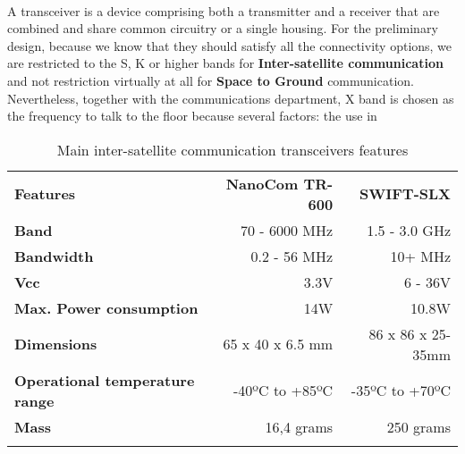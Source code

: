 \paragraph{} A transceiver is a device comprising both a transmitter and a receiver that are combined and share common circuitry or a single housing. For the preliminary design, because we know that they should satisfy all the connectivity options, we are restricted to the S, K or higher bands for \textbf{Inter-satellite communication} and not restriction virtually at all for \textbf{Space to Ground} communication. Nevertheless, together with the communications department, X band is chosen as the frequency to talk to the floor because several factors: the use in 
\begin{longtable}{| l | r | r |}
	
	\hline
	\rowcolor[gray]{0.60} \multicolumn{3}{|c|}{\textbf{Transceivers options - Inter-satellite comm.(S band)}} \\
	\hline
	
	\hline
	\rowcolor[gray]{0.75}	\textbf{Features} &  \textbf{NanoCom TR-600} & \textbf{SWIFT-SLX} \\
	\hline
	
	\cellcolor[gray]{0.85} \textbf{Band} & 70 - 6000 MHz  & 1.5 - 3.0 GHz\\
	\cellcolor[gray]{0.85} \textbf{Bandwidth} & 0.2 - 56 MHz& 10+ MHz\\
	\cellcolor[gray]{0.85} \textbf{Vcc} & 3.3V&6 - 36V \\
	\cellcolor[gray]{0.85} \textbf{Max. Power consumption} & 14W& 10.8W\\
	\cellcolor[gray]{0.85} \textbf{Dimensions} & 65 x 40 x 6.5 mm & 86 x 86 x 25-35mm\\
	\cellcolor[gray]{0.85} \textbf{Operational temperature range} & -40ºC to +85ºC & -35ºC to +70ºC\\
	\cellcolor[gray]{0.85} \textbf{Mass} & 16,4 grams&250 grams \\
	\hline
	
	\caption{Main inter-satellite communication transceivers features}
	\label{TransceiversSband}
	
\end{longtable}
